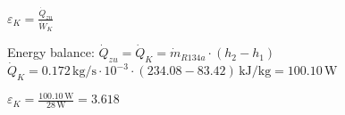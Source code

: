 \( \varepsilon_K = \frac{\dot{Q}_{zu}}{\dot{W}_K} \)  

Energy balance:  
\( \dot{Q}_{zu} = \dot{Q}_K = \dot{m}_{R134a} \cdot (h_2 - h_1) \)  
\( \dot{Q}_K = 0.172 \, \text{kg/s} \cdot 10^{-3} \cdot (234.08 - 83.42) \, \text{kJ/kg} = 100.10 \, \text{W} \)  

\( \varepsilon_K = \frac{100.10 \, \text{W}}{28 \, \text{W}} = 3.618 \)